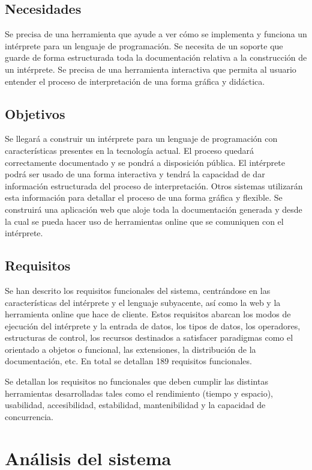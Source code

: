 \subsection{Necesidades}
Se precisa de una herramienta que ayude a ver cómo se implementa y funciona un intérprete para un lenguaje de programación. Se necesita de un soporte que guarde de forma estructurada toda la documentación 
relativa a la construcción de un intérprete. Se precisa de una herramienta interactiva que permita al usuario entender el proceso de interpretación de una forma gráfica y didáctica.

\subsection{Objetivos}
Se llegará a construir un intérprete para un lenguaje de programación con características presentes en la tecnología actual. El proceso quedará correctamente documentado y se pondrá a disposición pública. El intérprete podrá 
ser usado de una forma interactiva y tendrá la capacidad de dar información estructurada del proceso de interpretación. Otros sistemas utilizarán esta información para detallar el proceso de una forma gráfica y flexible.  Se construirá
una aplicación web que aloje toda la documentación generada y desde la cual se pueda hacer uso de herramientas online que se comuniquen con el intérprete. 

\subsection{Requisitos}
Se han descrito los requisitos funcionales del sistema, centrándose en las características del intérprete y el lenguaje subyacente, así como la web y la herramienta online que hace de cliente. Estos requisitos abarcan los modos de ejecución del intérprete y la entrada de datos, los tipos de 
datos, los operadores, estructuras de control, los recursos destinados a satisfacer paradigmas como el orientado a objetos o funcional, las extensiones, la distribución de la documentación, etc. En total se detallan 189 
requisitos funcionales.

Se detallan los requisitos no funcionales que deben cumplir las distintas herramientas desarrolladas tales como el rendimiento (tiempo y espacio), usabilidad, accesibilidad, estabilidad, mantenibilidad y 
la capacidad de concurrencia. 

\section{Análisis del sistema}
